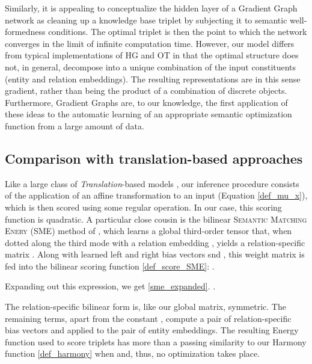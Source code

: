 \documentclass[a4paper,10pt]{article}
\begin{document}
Similarly, it is appealing to conceptualize the hidden layer of a Gradient Graph network as cleaning up a knowledge base triplet by subjecting it to semantic well-formedness conditions. The optimal triplet  is then the point to which the network converges in the limit of infinite computation time. However, our model differs from typical implementations of HG and OT in that the optimal structure  does not, in general, decompose into a unique combination of the input constituents (entity and relation embeddings). The resulting representations are in this sense gradient, rather than being the product of a combination of discrete objects. Furthermore, Gradient Graphs are, to our knowledge, the first application of these ideas to the automatic learning of an appropriate semantic optimization function from a large amount of data.

\subsection{Comparison with translation-based approaches}

Like a large class of \emph{Translation}-based models \citep{bordes2011transe,yoon2016translation,lin2015transR,ji2016sparseTrans}, our inference procedure consists of the application of an affine transformation to an input  (Equation \ref{def_mu_x}), which is then scored using some regular operation. In our case, this scoring function is quadratic. A particular close cousin is the bilinear \textsc{Semantic Matching Enery} (\textsc{SME}) method of \citet{bordes2014semanticenergy}, which learns a global third-order tensor  that, when dotted along the third mode with a relation embedding , yields a relation-specific matrix . Along with learned left and right bias vectors  snd , this weight matrix is fed into the bilinear scoring function \ref{def_score_SME}:
\ex. \\
\phantom{h}\hfill \label{def_score_SME}

Expanding out this expression, we get \ref{sme_expanded}.
\ex. 
\label{sme_expanded}

The relation-specific bilinear form  is, like our global  matrix, symmetric. The remaining terms, apart from the constant , compute a pair of relation-specific bias vectors  and  applied to the pair of entity embeddings.	The resulting Energy function used to score triplets has more than a passing similarity to our Harmony function \ref{def_harmony} when  and, thus, no optimization takes place. 
\end{document}
